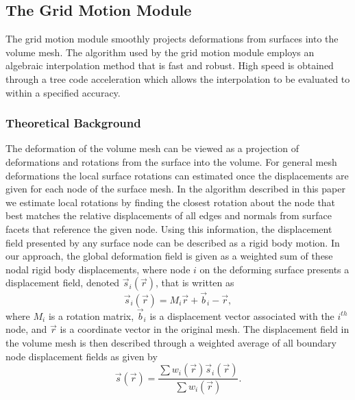 \subsection{The Grid Motion Module}

The grid  motion module  smoothly projects deformations  from surfaces
into the  volume mesh.  The algorithm  used by the  grid motion module
employs  an algebraic interpolation  method that  is fast  and robust.
High speed is  obtained through a tree code  acceleration which allows
the interpolation to be evaluated to within a specified accuracy.


\subsubsection{Theoretical Background}
The deformation of the volume mesh can be viewed as a projection of
deformations and rotations from the surface into the volume.  For
general mesh deformations the local surface rotations can estimated
once the displacements are given for each node of the surface mesh.
In the algorithm described in this paper we estimate local rotations
by finding the closest rotation about the node that best matches the
relative displacements of all edges and normals from surface facets
that reference the given node.  Using this information, the
displacement field presented by any surface node can be described as a
rigid body motion.  In our approach, the global deformation field is
given as a weighted sum of these nodal rigid body displacements, where
node $i$ on the deforming surface presents a displacement field,
denoted $\vec{s}_i(\vec{r})$, that is written as
\begin{equation}
\vec{s}_i(\vec{r}) = M_i \vec{r} + \vec{b}_i - \vec{r}, 
\end{equation}
where $M_i$ is a rotation matrix, $\vec{b}_i$ is a displacement
vector associated with the $i^{th}$ node, and $\vec{r}$ is a coordinate
vector in the original mesh.  The displacement field in the volume
mesh is then described through a weighted average of all boundary node
displacement fields as given by
\begin{equation}
\vec{s}(\vec{r}) =\frac{ \sum w_i(\vec{r}) \vec{s}_i(\vec{r})}
    { \sum w_i(\vec{r})}.
\label{eq:deformation}
\end{equation}

